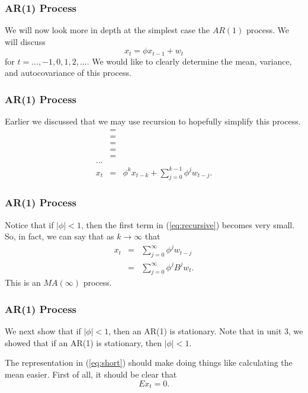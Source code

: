 \documentclass[%
xcolor=pdftex]{beamer}
\begin{document}
\begin{frame}
\frametitle{AR(1) Process}

We will now look more in depth at the simplest case the $AR(1)$ process. We will discuss
$$
x_t= \phi x_{t-1}+w_t
$$
for $t=...,-1,0,1,2,...$.
We would like to clearly determine the mean, variance, and autocovariance of this process.

\end{frame}


\begin{frame}
\frametitle{AR(1) Process}

Earlier we discussed that we may use recursion to hopefully simplify this process.
\begin{eqnarray} \label{eq:recursive}
 & =&  \nonumber \\
 & =&  \nonumber \\
& =&  \nonumber \\
 &=&  \nonumber\\
&=&  \nonumber \\
...& & \nonumber \\
x_t & =&  \phi^k   x_{t-k}+\sum_{j=0}^{k-1} \phi^j w_{t-j}.
\end{eqnarray}

\end{frame}

\begin{frame}
\frametitle{AR(1) Process}

Notice that if $|\phi|<1$, then the first term in (\ref{eq:recursive}) becomes very small.  So, in fact, we can say that as $k \rightarrow \infty$ that
\begin{eqnarray} \label{eq:short}
x_t &=& \sum_{j=0}^{\infty} \phi^j w_{t-j} \nonumber \\
    &=& \sum_{j=0}^{\infty} \phi^j B^j w_t.
\end{eqnarray}
This is an $MA(\infty)$ process.

\end{frame}


\begin{frame}
\frametitle{AR(1) Process}

We next show that if $|\phi| < 1$, then an AR(1) is stationary. Note that in unit 3, we showed that if an AR(1) is stationary, then $|\phi| < 1$.\\

\vspace{5mm}

The representation in (\ref{eq:short}) should make doing things like calculating the mean easier. First of all, it should be clear that
 $$
 Ex_t =0.
 $$

\end{frame}
\end{document}
